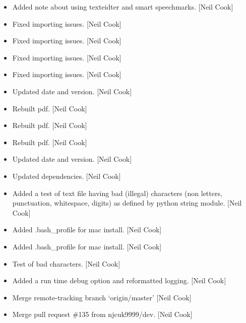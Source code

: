 \documentclass[a4paper,10pt,english]{report}
\begin{document}
\label{\detokenize{misc/changelog:id474}}\begin{itemize}
\item {} 
Added note about using texteidter and smart speechmarks. {[}Neil Cook{]}

\item {} 
Fixed importing issues. {[}Neil Cook{]}

\item {} 
Fixed importing issues. {[}Neil Cook{]}

\item {} 
Fixed importing issues. {[}Neil Cook{]}

\item {} 
Fixed importing issues. {[}Neil Cook{]}

\item {} 
Updated date and version. {[}Neil Cook{]}

\item {} 
Rebuilt pdf. {[}Neil Cook{]}

\item {} 
Rebuilt pdf. {[}Neil Cook{]}

\item {} 
Rebuilt pdf. {[}Neil Cook{]}

\item {} 
Updated date and version. {[}Neil Cook{]}

\item {} 
Updated dependencies. {[}Neil Cook{]}

\item {} 
Added a test of text file having bad (illegal) characters (non
letters, punctuation, whitespace, digits) as defined by python string
module. {[}Neil Cook{]}

\item {} 
Added .bash\_profile for mac install. {[}Neil Cook{]}

\item {} 
Added .bash\_profile for mac install. {[}Neil Cook{]}

\item {} 
Test of bad characters. {[}Neil Cook{]}

\item {} 
Added a run time debug option and reformatted logging. {[}Neil Cook{]}

\item {} 
Merge remote-tracking branch ‘origin/master’ {[}Neil Cook{]}

\item {} 
Merge pull request \#135 from njcuk9999/dev. {[}Neil Cook{]}


\end{itemize}
\end{document}
